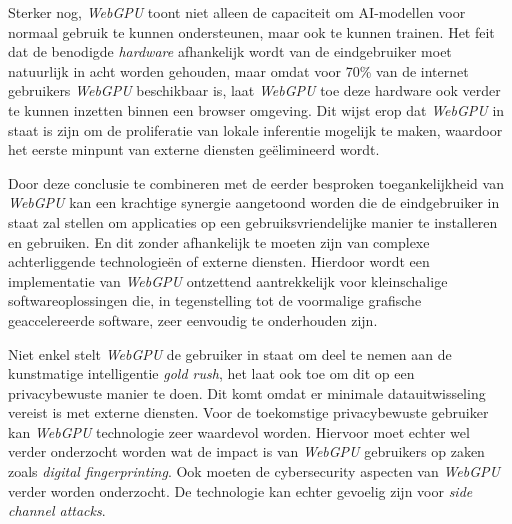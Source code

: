 \bigbreak{}

Sterker nog, \textit{WebGPU} toont niet alleen de capaciteit om  AI-modellen voor normaal gebruik te kunnen ondersteunen, maar ook te kunnen trainen. Het feit dat de benodigde \textit{hardware} afhankelijk wordt van de eindgebruiker moet natuurlijk in acht worden gehouden, maar omdat voor 70\% van de internet gebruikers \textit{WebGPU} beschikbaar is, laat \textit{WebGPU} toe deze hardware ook verder te kunnen inzetten binnen een browser omgeving. Dit wijst erop dat \textit{WebGPU} in staat is zijn om de proliferatie van lokale inferentie mogelijk te maken, waardoor het eerste minpunt van externe diensten geëlimineerd wordt.

\bigbreak{}

Door deze conclusie te combineren met de eerder besproken toegankelijkheid van \textit{WebGPU} kan een krachtige synergie aangetoond worden die de eindgebruiker in staat zal stellen om applicaties op een gebruiksvriendelijke manier te installeren en gebruiken. En dit zonder afhankelijk te moeten zijn van complexe achterliggende technologieën of externe diensten. Hierdoor wordt een implementatie van \textit{WebGPU} ontzettend aantrekkelijk voor kleinschalige softwareoplossingen die, in tegenstelling tot de voormalige grafische geaccelereerde software, zeer eenvoudig te onderhouden zijn.


\bigbreak{}

Niet enkel stelt \textit{WebGPU} de gebruiker in staat om deel te nemen aan de kunstmatige intelligentie \textit{gold rush}, het laat ook toe om dit op een privacybewuste manier te doen. Dit komt omdat er minimale datauitwisseling vereist is met externe diensten. Voor de toekomstige privacybewuste gebruiker kan \textit{WebGPU} technologie zeer waardevol worden. Hiervoor moet echter wel verder onderzocht worden wat de impact is van \textit{WebGPU} gebruikers op zaken zoals \textit{digital fingerprinting}. Ook moeten de cybersecurity aspecten van \textit{WebGPU} verder worden onderzocht. De technologie kan echter gevoelig zijn voor \textit{side channel attacks}.

\bigbreak{}
\iffalse
TODO Beschrijf dat er verder moet onderzocht worden welke apparaten in staat zijn welke modellen te kunnen ondersteunen, dat hier verder onderzoek naar moet worden uitgevoerd, en dat dit merkbaar was bij het uitvoeren van chatgpu.

- Ik heb gelezen dat \textit{WebGPU} beschikbaar is voor desktops/laptops, maar ook in mobiele browsers. In hoeverre zijn de GPU's van al deze toestellen sterk genoeg? Is dit een aspect waar rekening moet mee gehouden worden bij het beschikbaar stellen van software die \textit{WebGPU} gebruikt 
\fi

